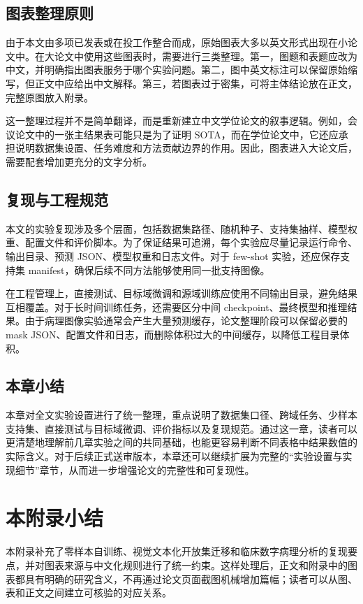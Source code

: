 \subsection{图表整理原则}
由于本文由多项已发表或在投工作整合而成，原始图表大多以英文形式出现在小论文中。在大论文中使用这些图表时，需要进行三类整理。第一，图题和表题应改为中文，并明确指出图表服务于哪个实验问题。第二，图中英文标注可以保留原始缩写，但正文中应给出中文解释。第三，若图表过于密集，可将主体结论放在正文，完整原图放入附录。

这一整理过程并不是简单翻译，而是重新建立中文学位论文的叙事逻辑。例如，会议论文中的一张主结果表可能只是为了证明 SOTA，而在学位论文中，它还应承担说明数据集设置、任务难度和方法贡献边界的作用。因此，图表进入大论文后，需要配套增加更充分的文字分析。

\subsection{复现与工程规范}
本文的实验复现涉及多个层面，包括数据集路径、随机种子、支持集抽样、模型权重、配置文件和评价脚本。为了保证结果可追溯，每个实验应尽量记录运行命令、输出目录、预测 JSON、模型权重和日志文件。对于 few-shot 实验，还应保存支持集 manifest，确保后续不同方法能够使用同一批支持图像。

在工程管理上，直接测试、目标域微调和源域训练应使用不同输出目录，避免结果互相覆盖。对于长时间训练任务，还需要区分中间 checkpoint、最终模型和推理结果。由于病理图像实验通常会产生大量预测缓存，论文整理阶段可以保留必要的 mask JSON、配置文件和日志，而删除体积过大的中间缓存，以降低工程目录体积。

\subsection{本章小结}
本章对全文实验设置进行了统一整理，重点说明了数据集口径、跨域任务、少样本支持集、直接测试与目标域微调、评价指标以及复现规范。通过这一章，读者可以更清楚地理解前几章实验之间的共同基础，也能更容易判断不同表格中结果数值的实际含义。对于后续正式送审版本，本章还可以继续扩展为完整的“实验设置与实现细节”章节，从而进一步增强论文的完整性和可复现性。


\section{本附录小结}
本附录补充了零样本自训练、视觉文本化开放集迁移和临床数字病理分析的复现要点，并对图表来源与中文化规则进行了统一约束。这样处理后，正文和附录中的图表都具有明确的研究含义，不再通过论文页面截图机械增加篇幅；读者可以从图、表和正文之间建立可核验的对应关系。
